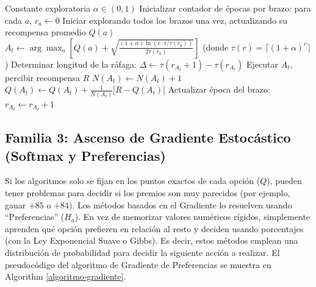 \begin{algorithm}
\caption{Algoritmo UCB2}\label{algoritmo-ucb2}
\begin{algorithmic}[1]
\Require Constante exploratoria $\alpha \in (0, 1)$
\State Inicializar contador de épocas por brazo: para cada $a$, $r_a \leftarrow 0$
\State Iniciar explorando todos los brazos una vez, actualizando su recompensa promedio $Q(a)$
    \State $A_t \leftarrow \arg\max_a \left[ Q(a) + \sqrt{\frac{(1 + \alpha) \ln (e \cdot t / \tau(r_a))}{2 \tau(r_a)}} \right]$ \newline
           (donde $\tau(r) = \lceil (1+\alpha)^r \rceil$)
    \State Determinar longitud de la ráfaga: $\Delta \leftarrow \tau(r_{A_t} + 1) - \tau(r_{A_t})$
        \State Ejecutar $A_t$, percibir recompensa $R$
        \State $N(A_t) \leftarrow N(A_t) + 1$
        \State $Q(A_t) \leftarrow Q(A_t) + \frac{1}{N(A_t)} \big[R - Q(A_t)\big]$
    \EndFor
    \State Actualizar época del brazo: $r_{A_t} \leftarrow r_{A_t} + 1$
\EndFor
\end{algorithmic}
\end{algorithm}

\subsection{Familia 3: Ascenso de Gradiente Estocástico (Softmax y
Preferencias)}\label{familia-3-ascenso-de-gradiente-estocuxe1stico-softmax-y-preferencias}

Si los algoritmos solo se fijan en los puntos
exactos de cada opción (\(Q\)), pueden tener problemas para decidir si
los premios son muy parecidos (por ejemplo, ganar \(+85\) o \(+84\)).
Los métodos basados en el Gradiente lo resuelven usando ``Preferencias''
(\(H_a\)). En vez de memorizar valores numéricos rígidos, simplemente
aprenden qué opción prefieren en relación al resto y deciden usando
porcentajes (con la Ley Exponencial Suave o Gibbs). Es decir, estos métodos 
emplean una distribución de probabilidad para decidir la siguiente acción a realizar.
El pseudocódigo del algoritmo de Gradiente de Preferencias se muestra en Algorithm \ref{algoritmo-gradiente}.

